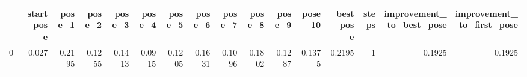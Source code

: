 \begin{tabular}{lrrrrrrrrrrrrrrr}
\toprule
{} &  start\_pose &  pose\_1 &  pose\_2 &  pose\_3 &  pose\_4 &  pose\_5 &  pose\_6 &  pose\_7 &  pose\_8 &  pose\_9 &  pose\_10 &  best\_pose &  steps &  improvement\_to\_best\_pose &  improvement\_to\_first\_pose \\
\midrule
0 &       0.027 &  0.2195 &  0.1255 &  0.1413 &  0.0915 &  0.1205 &  0.1631 &  0.1096 &  0.1802 &  0.1287 &   0.1375 &     0.2195 &      1 &                    0.1925 &                     0.1925 \\
\bottomrule
\end{tabular}
